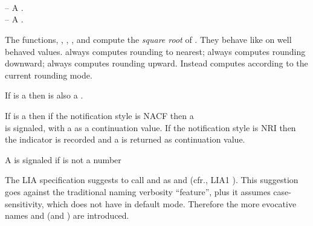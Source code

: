 \documentclass[../Comparisons-Predicates.tex]{subfiles}
\begin{document}
  
  
  \DSyntax{}
  
    \RArrow{} \\
    \RArrow{} \\
    \RArrow{} \\
    \RArrow{} 
  
  \DArgsNValues{}
  
   -- A .\\
   -- A .
  
  \DDescription{}
  
  The functions, , , , and
   compute the \emph{square root} of .  They
  behave like  on well behaved  values.
   always computes  rounding to nearest;
   always computes  rounding downward;
   always computes  rounding upward. Instead
   computes  according to the current rounding
  mode.
  
  If  is a  then  is also
  a .
  
  
  \DExceptional{}
  
  If \varname{} is a  then if the notification
  style is NACF then a\\
   is
  signaled, with a  as a continuation value.  If
  the notification style is NRI then the  indicator is
  recorded and a  is returned as continuation
  value.
  
  
  A  is signaled if  is not a number
  
  \DNotes{}
  
  The LIA specification suggests to call  and 
  as  and  (cfr., LIA1
  \cite{2012:LIA1}). This suggestion goes against the traditional \CL{}
  naming verbosity ``feature'', plus it assumes case-sensitivity, which
  \CL{} does not have in default mode.  Therefore the more evocative
  names  and  (and ) are
  introduced.
  
\end{document}
